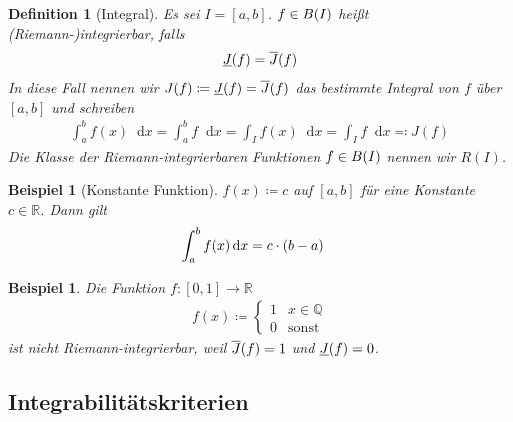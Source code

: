 \documentclass[11pt, twoside, a4paper]{article}
\theoremstyle{plain}
\newtheorem{definition}[blockelement]{Definition}
\newtheorem{beispiel}[blockelement]{Beispiel}
\newcommand{\pair}[1]{\left(#1\right)}
\newcommand{\of}[1]{\mathopen{}\mathclose{}\bgroup\left(#1\aftergroup\egroup\right)}
\newcommand{\interv}[1]{\left[#1\right]}
\newcommand{\fromto}{\rightarrow{}}
\newcommand{\definedas}[0]{\coloneqq}
\newcommand{\definedasbackwards}[0]{\eqqcolon}
\newcommand{\dif}{\mathop{}\!\mathrm{d}}
\newcommand{\R}{\mathbb{R}}
\newcommand{\Q}{\mathbb{Q}}
\begin{document}
    \begin{definition}[Integral]
        Es sei $I=\interv{a,b}$. $f\in B\of{I}$ heißt (Riemann-)integrierbar, falls
        \begin{align*}
            \underline{J}\of{f} = \overline{J}\of{f}
        \end{align*}
        In diese Fall nennen wir $J(f) \definedas \underline{J}\of{f} = \overline{J}\of{f}$ das bestimmte Integral von $f$ über $\interv{a,b}$ und schreiben
        \begin{align*}
            \int_{a}^{b} f(x) \dif x = \int_{a}^{b} f\dif x = \int_{I} f(x)\dif x = \int_{I} f\dif x \definedasbackwards J(f)
        \end{align*}
        Die Klasse der Riemann-integrierbaren Funktionen $f\in B\of{I}$ nennen wir $R(I)$.
    \end{definition}

    \begin{beispiel}[Konstante Funktion]
        \marginnote{[18. Apr]}
        $f(x) \definedas c$ auf $\interv{a,b}$ für eine Konstante $c\in\R$. Dann gilt
        \begin{align*}
            \int_{a}^{b} f\of{x} \dif x &= c\cdot\pair{b-a}
        \end{align*}
    \end{beispiel}
    
    \begin{beispiel}
        Die Funktion $f: \interv{0,1}\fromto\R$
        \begin{align*}
            f(x) \definedas \begin{cases}
                                1 &x\in \Q\\
                                0 &\text{sonst}
            \end{cases}
        \end{align*}
        ist nicht Riemann-integrierbar, weil $\overline{J}\of{f} = 1$ und $\underline{J}\of{f} = 0$.
    \end{beispiel}
    
    \subsection{Integrabilitätskriterien}
\end{document}
